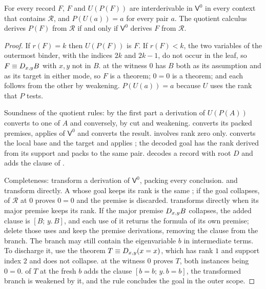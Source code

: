 \begin{proposition}
\label{claus:prop:support}
For every record $F$, $F$ and $U(P(F))$ are interderivable in
$\mathsf{V}^{0}$ in every context that contains $\mathcal{R}$, and
$P(U(a))=a$ for every pair $a$. The quotient calculus derives $P(F)$ from
$\mathcal{R}$ if and only if $\mathsf{V}^{0}$ derives $F$ from
$\mathcal{R}$.
\end{proposition}
\begin{proof}
If $r(F)=k$ then $U(P(F))$ is $F$. If $r(F)<k$, the two variables of the
outermost binder, with the indices $2k$ and $2k-1$, do not occur in the
leaf, so $F\equiv D_{x,y}B$ with $x,y$ not in $B$.  at the
witness $0$ has $B$ both as its assumption and as its target in either
mode, so $F$ is a theorem; $0=0$ is a theorem; and each follows from the
other by weakening. $P(U(a))=a$ because $U$ uses the rank that $P$ tests.

Soundness of the quotient rules: by the first part a derivation of
$U(P(A))$ converts to one of $A$ and conversely, by cut and weakening.
 converts its packed premises, applies  of
$\mathsf{V}^{0}$ and converts the result.  involves rank
zero only.  converts the local base and the target and
applies ; the decoded goal has the rank derived from its
support and packs to the same pair.  decodes a record with
root $D$ and adds the clause of .

Completeness: transform a derivation of $\mathsf{V}^{0}$, packing every
conclusion.  and  transform directly. A
 whose goal keeps its rank is the same ;
if the goal collapses,  of $\mathcal{R}$ at $0$ proves
$0=0$ and the premise is discarded.  transforms directly
when its major premise keeps its rank. If the major premise $D_{x,y}B$
collapses, the added clause is $[B;\,y.\,B]$, and each use of it returns
the formula of its own premise; delete those uses and keep the premise
derivations, removing the clause from the branch. The branch may still
contain the eigenvariable $b$ in intermediate terms. To discharge it, use
the theorem $T\equiv D_{x,y}(x=x)$, which has rank $1$ and support index
$2$ and does not collapse.  at the witness $0$ proves $T$,
both instances being $0=0$.  of $T$ at the fresh $b$ adds
the clause $[b=b;\,y.\,b=b]$, the transformed branch is weakened by it,
and the rule concludes the goal in the outer scope.
\end{proof}

